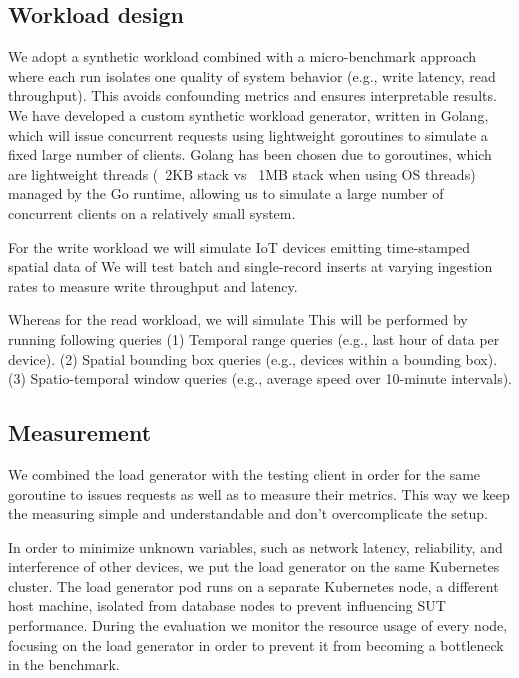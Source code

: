 \subsection{Workload design}
We adopt a synthetic workload combined with a micro-benchmark approach where each run isolates one quality of system behavior (e.g., write latency, read throughput).
This avoids confounding metrics and ensures interpretable results. We have developed a custom synthetic workload generator, written in Golang, which will issue concurrent requests using lightweight goroutines to simulate a fixed large number of clients.
Golang has been chosen due to goroutines, which are lightweight threads (~2KB stack vs ~1MB stack when using OS threads) managed by the Go runtime, allowing us to simulate a large number of concurrent clients on a relatively small system.

For the write workload we will simulate IoT devices emitting time-stamped spatial data of %
We will test batch and single-record inserts at varying ingestion rates to measure write throughput and latency.

Whereas for the read workload, we will simulate %
This will be performed by running following queries
(1) Temporal range queries (e.g., last hour of data per device).
(2) Spatial bounding box queries (e.g., devices within a bounding box).
(3) Spatio-temporal window queries (e.g., average speed over 10-minute intervals).

\subsection{Measurement}
We combined the load generator with the testing client in order for the same goroutine to issues requests as well as to measure their metrics.
This way we keep the measuring simple and understandable and don't overcomplicate the setup.

In order to minimize unknown variables, such as network latency, reliability, and interference of other devices, we put the load generator on the same Kubernetes cluster.
The load generator pod runs on a separate Kubernetes node, a different host machine, isolated from database nodes to prevent influencing SUT performance.
During the evaluation we monitor the resource usage of every node, focusing on the load generator in order to prevent it from becoming a bottleneck in the benchmark.
